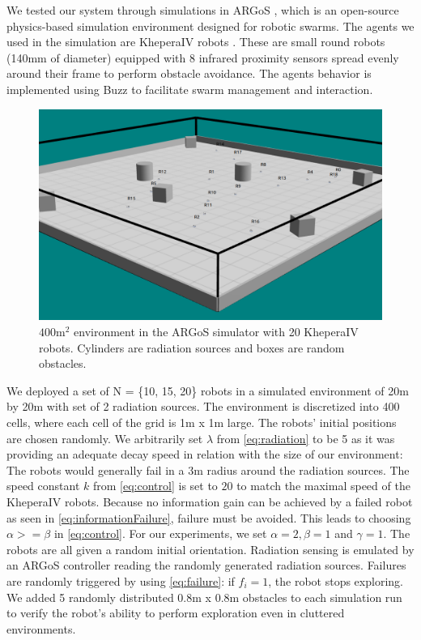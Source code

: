 \documentclass[letterpaper, 10 pt, conference]{ieeeconf}
\begin{document}
We tested our system through simulations in ARGoS
\cite{Pinciroli:SI2012}, which is an open-source physics-based
simulation environment designed for robotic swarms. The agents we used
in the simulation are KheperaIV robots
\cite{kteam2021kheperaiv}. These are small round robots (140mm of
diameter) equipped with 8 infrared proximity sensors spread evenly
around their frame to perform obstacle avoidance. The
agents behavior is implemented using Buzz to facilitate swarm
management and interaction.

\begin{figure}[h]
	\centering
    \includegraphics[width=0.95\columnwidth]{images/argos.png}
    \caption{$400 \text{m}^2$ environment in the ARGoS simulator with 20 KheperaIV robots. Cylinders are radiation sources and boxes are random obstacles.}
    \label{argos}
\end{figure}

We deployed a set of N = \{10, 15, 20\} robots in a simulated
environment of 20m by 20m with set of 2 radiation sources. The environment is discretized into 400 cells, where each cell of the grid is 1m x 1m large. The robots'
initial positions are chosen randomly. We arbitrarily set $\lambda$ from
\eqref{eq:radiation} to be 5 as it was providing an adequate decay speed in relation with the size of our environment: The robots would generally fail in a 3m radius around the radiation sources. The speed constant $k$ from \eqref{eq:control} is set to
$20$ to match the maximal speed of the KheperaIV robots. Because no information gain can be achieved by a failed robot as
seen in \eqref{eq:informationFailure}, failure must be avoided. This
leads to choosing $\alpha >= \beta$ in \eqref{eq:control}. For our
experiments, we set $\alpha=2, \beta=1$ and $\gamma=1$. The robots are
all given a random initial orientation. Radiation sensing is emulated
by an ARGoS controller reading the randomly generated radiation
sources. Failures are randomly triggered by using \eqref{eq:failure}:
if $f_i=1$, the robot stops exploring. We added 5 randomly distributed
0.8m x 0.8m obstacles to each simulation run to verify the robot's ability to
perform exploration even in cluttered environments.
\end{document}
